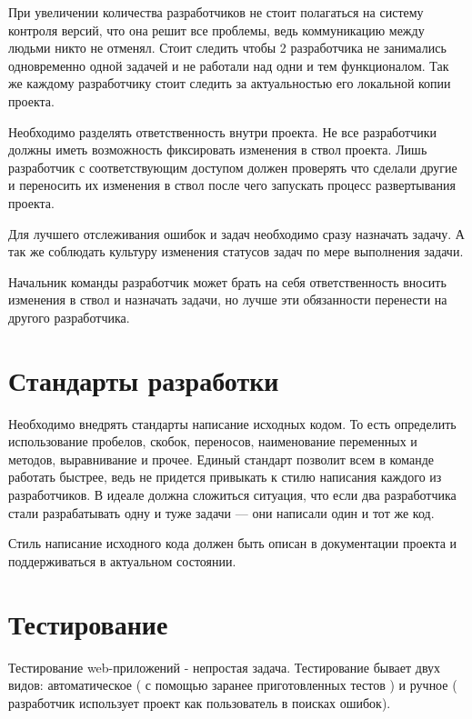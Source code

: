 При увеличении количества разработчиков не стоит полагаться на систему контроля версий, что она решит все проблемы, ведь коммуникацию между людьми никто не отменял. Стоит следить чтобы 2 разработчика не занимались одновременно одной задачей и не работали над одни и тем функционалом. Так же каждому разработчику стоит следить за актуальностью его локальной копии проекта.

Необходимо разделять ответственность внутри проекта. Не все разработчики должны иметь возможность фиксировать изменения в ствол проекта. Лишь разработчик с соответствующим доступом должен проверять что сделали другие и переносить их изменения в ствол после чего запускать процесс развертывания проекта.


Для лучшего отслеживания ошибок и задач необходимо сразу назначать задачу. А так же соблюдать культуру изменения статусов задач по мере выполнения задачи.

Начальник команды разработчик может брать на себя ответственность вносить изменения в ствол и назначать задачи, но лучше эти обязанности перенести на другого разработчика.

\section{ Стандарты разработки } \label{sect2_21}

Необходимо внедрять стандарты написание исходных кодом. То есть определить использование пробелов, скобок, переносов, наименование переменных и методов, выравнивание и прочее. Единый стандарт позволит всем в команде работать быстрее, ведь не придется привыкать к стилю написания каждого из разработчиков. В идеале должна сложиться ситуация, что если два разработчика стали разрабатывать одну и туже задачи --- они написали один и тот же код.

Стиль написание исходного кода должен быть описан в документации проекта и поддерживаться в актуальном состоянии.


\section{ Тестирование } \label{sect2_22}

Тестирование web-приложений - непростая задача. Тестирование бывает двух видов: автоматическое ( с помощью заранее приготовленных тестов ) и ручное ( разработчик использует проект как пользователь в поисках ошибок).

